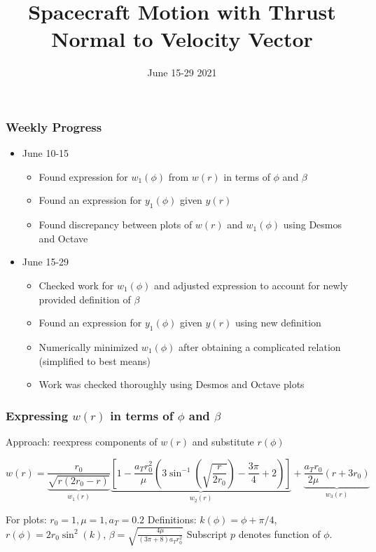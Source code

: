\documentclass{beamer}
\title{Spacecraft Motion with Thrust Normal to Velocity Vector}
\date{June 15-29 2021}
\begin{document}
\frame{\titlepage}

\begin{frame}

\frametitle{Weekly Progress}

\begin{itemize}
    \item June 10-15
    \begin{itemize}
        \item Found expression for $w_1(\phi)$ from $w(r)$ in terms of $\phi$ and $\beta$
        \item Found an expression for $y_1(\phi)$ given $y(r)$
        \item Found discrepancy between plots of $w(r)$ and $w_1(\phi)$ using Desmos and Octave
    \end{itemize}
    \item June 15-29
    \begin{itemize}
        \item Checked work for $w_1(\phi)$ and adjusted expression to account for newly provided definition of $\beta$
        \item Found an expression for $y_1(\phi)$ given $y(r)$ using new definition
        \item Numerically minimized $w_1(\phi)$ after obtaining a complicated relation (simplified to best means)
        \item Work was checked thoroughly using Desmos and Octave plots
    \end{itemize}
\end{itemize}

\end{frame}

\begin{frame}
    \frametitle{Expressing $w(r)$ in terms of $\phi$ and $\beta$}

    Approach: reexpress components of $w(r)$ and substitute $r(\phi)$

    
    {\scriptsize{$$
    w(r)=\underbrace{\frac{r_{0}}{\sqrt{r\left(2 r_{0}-r\right)}}}_{w_1(r)}
        \underbrace{\left[1-\frac{a_{T} r_{0}^{2}}{\mu}\left(3 \sin ^{-1}\left(\sqrt{\frac{r}{2 r_{0}}}\right)-\frac{3 \pi}{4}+2\right)\right]}_{w_2(r)}
        +\underbrace{\frac{a_{T} r_{0}}{2 \mu}\left(r+3 r_{0}\right)}_{w_3(r)}
    $$}}

    For plots: $r_0=1, \mu=1, a_T=0.2$\newline
    Definitions: $k(\phi)=\phi+\pi/4$, $r(\phi)=2r_0\sin^2(k)$, $\beta=\sqrt{\frac{4\mu}{(3\pi+8)a_Tr_0^2}}$\newline
    Subscript $p$ denotes function of $\phi$.

\end{frame}
\end{document}
